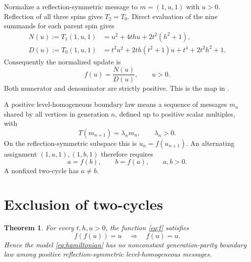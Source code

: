 \documentclass[11pt,a4paper]{article}
\numberwithin{equation}{section}
\newtheorem{theorem}{Theorem}
\begin{document}
Normalize a reflection-symmetric message to $m=(1,u,1)$ with $u>0$.
Reflection of all three spins gives $T_2=T_0$. Direct evaluation of the
nine summands for each parent spin gives
\begin{align}
 N(u):=T_1(1,u,1)&=u^2+4thu+2t^2(h^2+1),\label{eq:N}\\
 D(u):=T_0(1,u,1)&=t^2u^2+2th(t^2+1)u+t^4+2t^2h^2+1.
 \label{eq:D}
\end{align}
Consequently the normalized update is
\begin{equation}
 f(u)=\frac{N(u)}{D(u)},\qquad u>0.
 \label{eq:f}
\end{equation}
Both numerator and denominator are strictly positive. This is the map
in \citet[Eq.~(12), p.~137]{KR2025}.

A positive level-homogeneous boundary law means a sequence of messages
$m_n$ shared by all vertices in generation $n$, defined up to positive
scalar multiples, with
\begin{equation}
 T(m_{n+1})=\lambda_n m_n,\qquad \lambda_n>0.
 \label{eq:compatibility}
\end{equation}
On the reflection-symmetric subspace this is $u_n=f(u_{n+1})$.
An alternating assignment $(1,a,1),(1,b,1)$ therefore requires
\begin{equation}
 a=f(b),\qquad b=f(a),\qquad a,b>0.
 \label{eq:cycle}
\end{equation}
A nonfixed two-cycle has $a\ne b$.

\section{Exclusion of two-cycles}
\label{sec:proof}
\begin{theorem}
\label{thm:main}
For every $t,h,u>0$, the function \eqref{eq:f} satisfies
\begin{equation}
 f(f(u))=u\quad\Longrightarrow\quad f(u)=u.
 \label{eq:theorem}
\end{equation}
Hence the model \eqref{eq:hamiltonian} has no nonconstant
generation-parity boundary law among positive reflection-symmetric
level-homogeneous messages.
\end{theorem}
\end{document}
